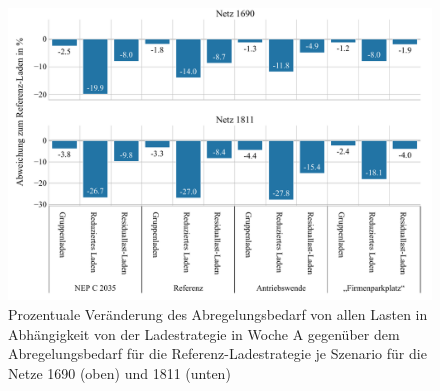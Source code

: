 \begin{figure}[H]
    \centering
    \includegraphics[width=\textwidth]{Bilder/1690_1811_cur_load_grid_week_A}
    \caption{Prozentuale Veränderung des Abregelungsbedarf von allen Lasten in Abhängigkeit von der Ladestrategie in Woche A gegenüber dem Abregelungsbedarf für die Referenz-Ladestrategie je Szenario für die Netze \num{1690} (oben) und \num{1811} (unten)}\label{fig:1690_1811_cur_load_grid_week_A}
\end{figure}
